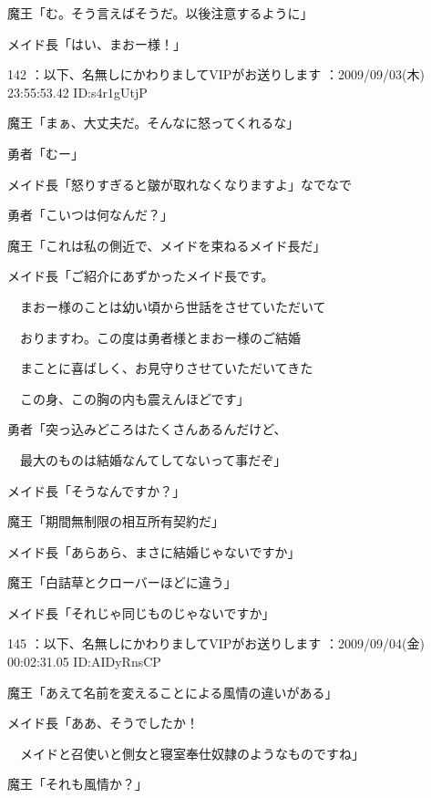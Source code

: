 \documentclass[a4j,twocolumn]{tarticle}
\begin{document}
魔王「む。そう言えばそうだ。以後注意するように」\par{} 
メイド長「はい、まおー様！」 

	
    
    

142 ：以下、名無しにかわりましてVIPがお送りします ：2009/09/03(木) 23:55:53.42 ID:s4r1gUtjP 


魔王「まぁ、大丈夫だ。そんなに怒ってくれるな」\par{} 
勇者「むー」\par{} 
メイド長「怒りすぎると皺が取れなくなりますよ」なでなで 



勇者「こいつは何なんだ？」 \par{}
魔王「これは私の側近で、メイドを束ねるメイド長だ」 



メイド長「ご紹介にあずかったメイド長です。\par{} 
　まおー様のことは幼い頃から世話をさせていただいて\par{} 
　おりますわ。この度は勇者様とまおー様のご結婚\par{} 
　まことに喜ばしく、お見守りさせていただいてきた\par{} 
　この身、この胸の内も震えんほどです」 



勇者「突っ込みどころはたくさんあるんだけど、\par{} 
　最大のものは結婚なんてしてないって事だぞ」 



メイド長「そうなんですか？」 



魔王「期間無制限の相互所有契約だ」\par{} 
メイド長「あらあら、まさに結婚じゃないですか」 



魔王「白詰草とクローバーほどに違う」\par{} 
メイド長「それじゃ同じものじゃないですか」

	 

	

145 ：以下、名無しにかわりましてVIPがお送りします ：2009/09/04(金) 00:02:31.05 ID:AIDyRnsCP 


魔王「あえて名前を変えることによる風情の違いがある」 



メイド長「ああ、そうでしたか！\par{} 
　メイドと召使いと側女と寝室奉仕奴隷のようなものですね」\par{} 
魔王「それも風情か？」 
\end{document}
